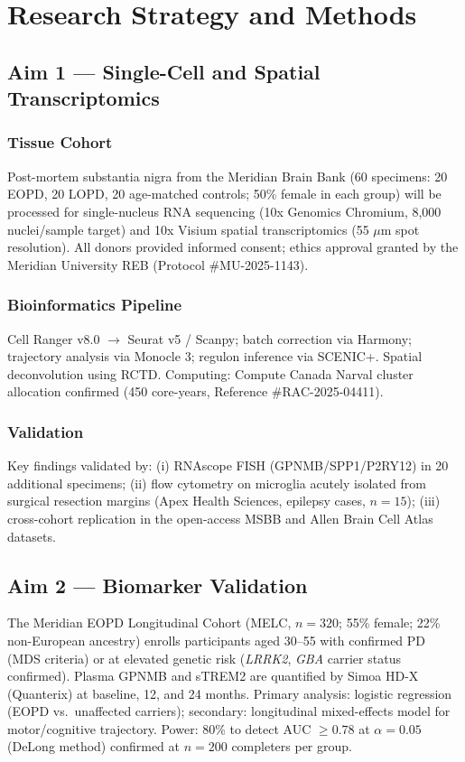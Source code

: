 \section{Research Strategy and Methods}

\subsection{Aim 1 --- Single-Cell and Spatial Transcriptomics}

\subsubsection{Tissue Cohort}
Post-mortem substantia nigra from the Meridian Brain Bank (60 specimens: 20 EOPD, 20 LOPD, 20 age-matched controls; 50\% female in each group) will be processed for single-nucleus RNA sequencing (10x Genomics Chromium, 8,000 nuclei/sample target) and 10x Visium spatial transcriptomics (55 $\mu$m spot resolution). All donors provided informed consent; ethics approval granted by the Meridian University REB (Protocol \#MU-2025-1143).

\subsubsection{Bioinformatics Pipeline}
Cell Ranger v8.0 $\rightarrow$ Seurat v5 / Scanpy; batch correction via Harmony; trajectory analysis via Monocle 3; regulon inference via SCENIC+. Spatial deconvolution using RCTD. Computing: Compute Canada Narval cluster allocation confirmed (450 core-years, Reference \#RAC-2025-04411).

\subsubsection{Validation}
Key findings validated by: (i) RNAscope FISH (GPNMB/SPP1/P2RY12) in 20 additional specimens; (ii) flow cytometry on microglia acutely isolated from surgical resection margins (Apex Health Sciences, epilepsy cases, $n=15$); (iii) cross-cohort replication in the open-access MSBB and Allen Brain Cell Atlas datasets.

\subsection{Aim 2 --- Biomarker Validation}

The Meridian EOPD Longitudinal Cohort (MELC, $n=320$; 55\% female; 22\% non-European ancestry) enrolls participants aged 30--55 with confirmed PD (MDS criteria) or at elevated genetic risk (\textit{LRRK2}, \textit{GBA} carrier status confirmed). Plasma GPNMB and sTREM2 are quantified by Simoa HD-X (Quanterix) at baseline, 12, and 24 months. Primary analysis: logistic regression (EOPD vs.\ unaffected carriers); secondary: longitudinal mixed-effects model for motor/cognitive trajectory. Power: 80\% to detect AUC $\geq 0.78$ at $\alpha=0.05$ (DeLong method) confirmed at $n=200$ completers per group.

